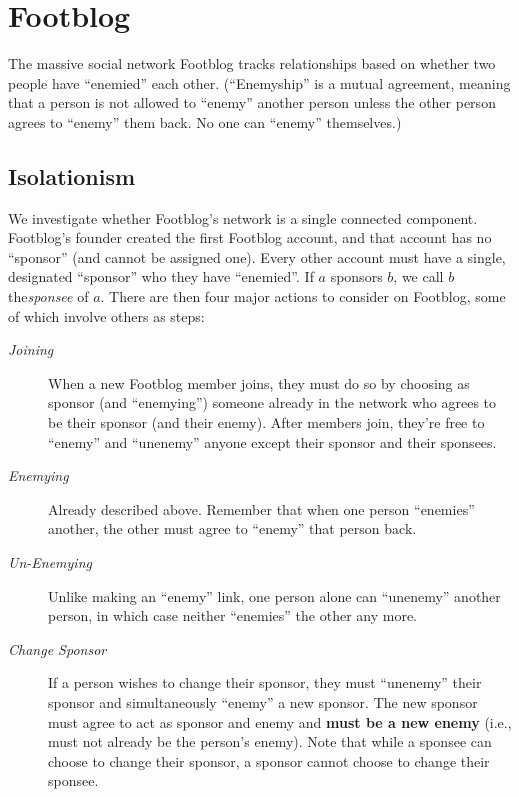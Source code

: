 \documentclass[11pt, oneside]{article}   	%
\theoremstyle{definition}
\theoremstyle{remark}
\begin{document}
\cleardoublepage
\section{Footblog}
The massive social network Footblog tracks relationships based on
whether two people have ``enemied'' each other. (``Enemyship'' is a mutual
agreement, meaning that a person is not allowed to ``enemy'' another
person unless the other person agrees to ``enemy'' them back. No one can
``enemy'' themselves.)

\subsection{Isolationism}
We investigate whether Footblog's network is a single connected
component.
Footblog's founder created the first Footblog account, and that
account has no ``sponsor'' (and cannot be assigned one). Every other account must have a single, designated ``sponsor'' who they have ``enemied''. If $a$ sponsors $b$, we call $b$ the\emph{sponsee} of $a$.
There are then four major actions to consider on Footblog, some of which involve others as steps:
\begin{description}
	\item[\emph{Joining}] When a new Footblog member joins, they must do so by
               choosing as sponsor (and ``enemying'') someone already in
               the network who agrees to be their sponsor (and their
               enemy). After members join, they're free to ``enemy''
               and ``unenemy'' anyone except their sponsor and their
               sponsees.
	\item[\emph{Enemying}] Already described above. Remember that when one person
                ``enemies'' another, the other must agree to ``enemy''
                that person back.
	\item[\emph{Un-Enemying}] Unlike making an ``enemy'' link, one person alone can
                   ``unenemy'' another person, in which case neither
                   ``enemies'' the other any more.
	\item[\emph{Change Sponsor}] If a person wishes to change their sponsor, they
     must ``unenemy'' their sponsor and simultaneously ``enemy'' a new
     sponsor. The new sponsor must agree to act as sponsor and enemy
     and \textbf{must be a new enemy} (i.e., must not already be the person's
     enemy). Note that while a sponsee can choose to change their
     sponsor, a sponsor cannot choose to change their sponsee.
\end{description}
\end{document}
